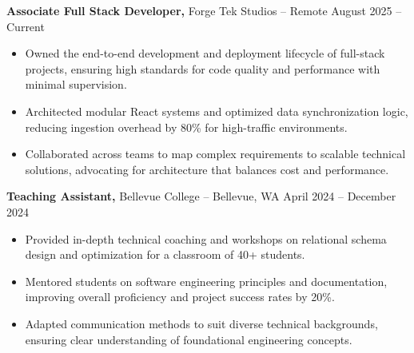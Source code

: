 \documentclass[11pt]{article}       %
\begin{document}
\textbf{Associate Full Stack Developer,} {Forge Tek Studios} -- Remote \hfill August 2025 -- Current 
\vspace{-9pt}
\begin{itemize}
  \item Owned the end-to-end development and deployment lifecycle of full-stack projects, ensuring high standards for code quality and performance with minimal supervision.
  \item Architected modular React systems and optimized data synchronization logic, reducing ingestion overhead by 80\% for high-traffic environments.
  \item Collaborated across teams to map complex requirements to scalable technical solutions, advocating for architecture that balances cost and performance.
\end{itemize}

\textbf{Teaching Assistant,} {Bellevue College} -- Bellevue, WA \hfill April 2024 -- December 2024 \\
\vspace{-9pt}
\begin{itemize}
  \item Provided in-depth technical coaching and workshops on relational schema design and optimization for a classroom of 40+ students.
  \item Mentored students on software engineering principles and documentation, improving overall proficiency and project success rates by 20\%.
  \item Adapted communication methods to suit diverse technical backgrounds, ensuring clear understanding of foundational engineering concepts.
\end{itemize}

\end{document}
